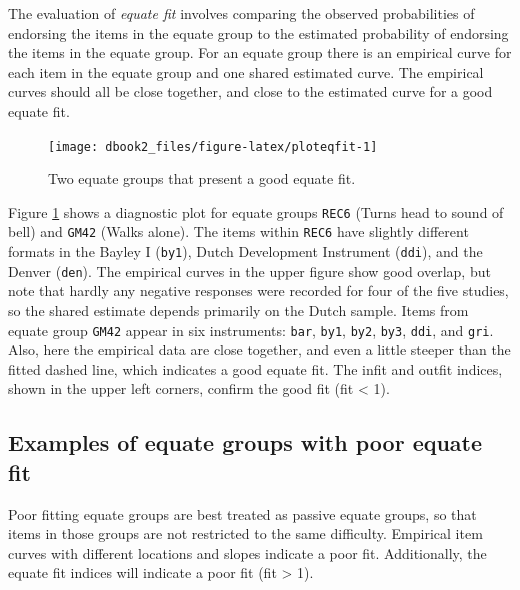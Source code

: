 \documentclass[
]{book}
\begin{document}
The evaluation of \emph{equate fit} involves comparing the observed probabilities of endorsing the items in the equate group to the estimated probability of endorsing the items in the equate group. For an equate group there is an empirical curve for each item in the equate group and one shared estimated curve. The empirical curves should all be close together, and close to the estimated curve for a good equate fit.

\begin{figure}

{\centering \texttt{[image: dbook2\_files/figure-latex/ploteqfit-1]} 

}

\caption{Two equate groups that present a good equate fit.}\label{fig:ploteqfit}
\end{figure}



Figure \ref{fig:ploteqfit} shows a diagnostic plot for equate groups \texttt{REC6} (Turns head to sound of bell) and \texttt{GM42} (Walks alone). The items within \texttt{REC6} have slightly different formats in the Bayley I (\texttt{by1}), Dutch Development Instrument (\texttt{ddi}), and the Denver (\texttt{den}). The empirical curves in the upper figure show good overlap, but note that hardly any negative responses were recorded for four of the five studies, so the shared estimate depends primarily on the Dutch sample. Items from equate group \texttt{GM42} appear in six instruments: \texttt{bar}, \texttt{by1}, \texttt{by2}, \texttt{by3}, \texttt{ddi}, and \texttt{gri}. Also, here the empirical data are close together, and even a little steeper than the fitted dashed line, which indicates a good equate fit. The infit and outfit indices, shown in the upper left corners, confirm the good fit (fit \textless{} 1).

\hypertarget{examples-of-equate-groups-with-poor-equate-fit}{%
\subsection{Examples of equate groups with poor equate fit}\label{examples-of-equate-groups-with-poor-equate-fit}}

Poor fitting equate groups are best treated as passive equate groups, so that items in those groups are not restricted to the same difficulty. Empirical item curves with different locations and slopes indicate a poor fit. Additionally, the equate fit indices will indicate a poor fit (fit \textgreater{} 1).
\end{document}

